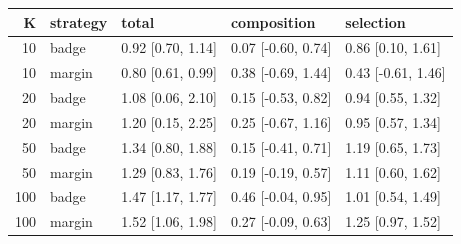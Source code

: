 \begin{tabular}{rllll}
\toprule
K & strategy & total & composition & selection \\
\midrule
10 & badge & 0.92 [0.70, 1.14] & 0.07 [-0.60, 0.74] & 0.86 [0.10, 1.61] \\
10 & margin & 0.80 [0.61, 0.99] & 0.38 [-0.69, 1.44] & 0.43 [-0.61, 1.46] \\
20 & badge & 1.08 [0.06, 2.10] & 0.15 [-0.53, 0.82] & 0.94 [0.55, 1.32] \\
20 & margin & 1.20 [0.15, 2.25] & 0.25 [-0.67, 1.16] & 0.95 [0.57, 1.34] \\
50 & badge & 1.34 [0.80, 1.88] & 0.15 [-0.41, 0.71] & 1.19 [0.65, 1.73] \\
50 & margin & 1.29 [0.83, 1.76] & 0.19 [-0.19, 0.57] & 1.11 [0.60, 1.62] \\
100 & badge & 1.47 [1.17, 1.77] & 0.46 [-0.04, 0.95] & 1.01 [0.54, 1.49] \\
100 & margin & 1.52 [1.06, 1.98] & 0.27 [-0.09, 0.63] & 1.25 [0.97, 1.52] \\
\bottomrule
\end{tabular}
